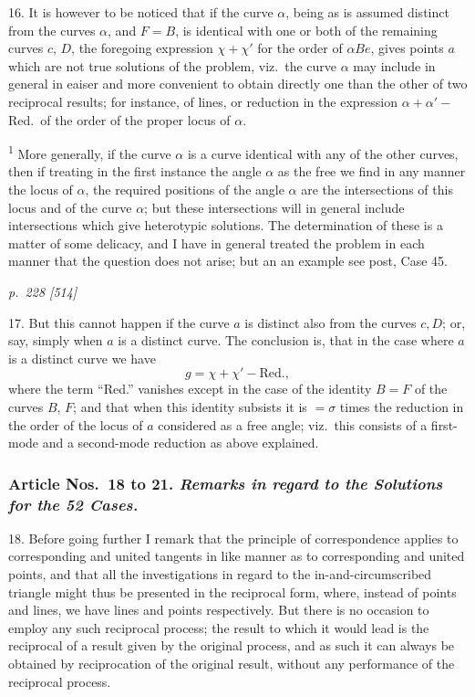 \documentclass[11pt,a4paper]{article}
\theoremstyle{plain}
\theoremstyle{definition}
\begin{document}
16. It is however to be noticed that if the curve $\alpha$, being as is assumed distinct
from the curves $\alpha$, and $F=B$, is identical with one or both of the remaining curves
$c$, $D$, the foregoing expression $\chi+\chi'$ for the order of $\alpha Be$, gives points $a$ which are not true
solutions of the problem, viz.\ the curve $\alpha$ may include in general in eaiser and more
convenient to obtain directly one than the other of two reciprocal results; for instance,
of lines, or reduction in the expression $\alpha + \alpha' - $ Red.\ of the order of the proper
locus of $\alpha$.

\bigskip
\noindent\textsuperscript{1} More generally, if the curve $\alpha$ is a curve identical with any of the other curves, then if treating in
the first instance the angle $\alpha$ as the free we find in any manner the locus of $\alpha$, the required positions of the
angle $\alpha$ are the intersections of this locus and of the curve $\alpha$; but these intersections will in general
include intersections which give heterotypic solutions. The determination of these is a matter of some
delicacy, and I have in general treated the problem in each manner that the question does not arise; but
an an example see post, Case 45.

\clearpage

\bigskip
\textit{p.~228 [514]}
\smallskip

17. But this cannot happen if the curve $a$ is distinct also from the curves $c, D$;
or, say, simply when $a$ is a distinct curve.  The conclusion is, that in the case where
$a$ is a distinct curve we have
\[
g=\chi+\chi'-\text{Red.},
\]
where the term ``Red.'' vanishes except in the case of the identity $B=F$ of the
curves $B$, $F$; and that when this identity subsists it is $=\sigma$ times the reduction in
the order of the locus of $a$ considered as a free angle; viz.\ this consists of a first-
mode and a second-mode reduction as above explained.

\bigskip
\subsubsection*{Article Nos.\ 18 to 21.  \textit{Remarks in regard to the Solutions for the 52 Cases.}}

18. Before going further I remark that the principle of correspondence applies to
corresponding and united tangents in like manner as to corresponding and united
points, and that all the investigations in regard to the in-and-circumscribed triangle
might thus be presented in the reciprocal form, where, instead of points and lines,
we have lines and points respectively.  But there is no occasion to employ any such
reciprocal process; the result to which it would lead is the reciprocal of a result
given by the original process, and as such it can always be obtained by reciprocation
of the original result, without any performance of the reciprocal process.
\end{document}
